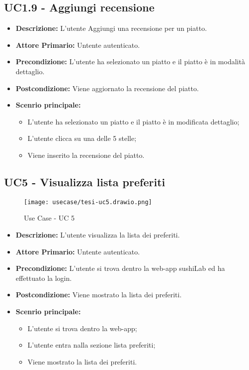 \subsection{UC1.9 - Aggiungi recensione}
\begin{itemize}
    \item \textbf{Descrizione:} L'utente Aggiungi una recensione per un piatto.
    \item \textbf{Attore Primario:} Untente autenticato.
    \item \textbf{Precondizione:} L'utente ha selezionato un piatto e il piatto è in modalità dettaglio.
    \item \textbf{Postcondizione:} Viene aggiornato la recensione del piatto.
    \item \textbf{Scenrio principale:}
    \begin{itemize}
        \item L'utente ha selezionato un piatto e il piatto è in modificata dettaglio;
        \item L'utente clicca su una delle 5 stelle;
        \item Viene inserito la recensione del piatto.
    \end{itemize}
\end{itemize}
\subsection{UC5 - Visualizza lista preferiti}
\begin{figure}[H]
    \centering
    \texttt{[image: usecase/tesi-uc5.drawio.png]}
    \caption{Use Case - UC 5}
\end{figure}
\begin{itemize}
    \item \textbf{Descrizione:} L'utente visualizza la lista dei preferiti.
    \item \textbf{Attore Primario:} Untente autenticato.
    \item \textbf{Precondizione:} L'utente si trova dentro la web-app sushiLab ed ha effettuato la login.
    \item \textbf{Postcondizione:} Viene mostrato la lista dei preferiti.
    \item \textbf{Scenrio principale:}
    \begin{itemize}
        \item L'utente si trova dentro la web-app;
        \item L'utente entra nalla sezione lista preferiti;
        \item Viene mostrato la lista dei preferiti.
    \end{itemize}
\end{itemize}

